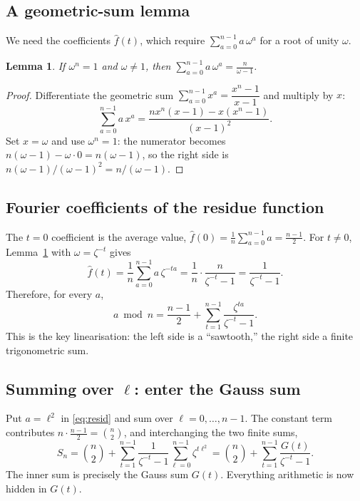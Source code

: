 \documentclass[11pt]{article}
\newtheorem{lemma}{Lemma}
\begin{document}
\subsection{A geometric-sum lemma}
We need the coefficients $\hat f(t)$, which require $\sum_{a=0}^{n-1}a\,\omega^a$ for a root of unity $\omega$.

\begin{lemma}\label{lem:geo}
If $\omega^n=1$ and $\omega\ne1$, then $\displaystyle\sum_{a=0}^{n-1}a\,\omega^{a}=\frac{n}{\omega-1}$.
\end{lemma}

\begin{proof}
Differentiate the geometric sum $\sum_{a=0}^{n-1}x^a=\dfrac{x^n-1}{x-1}$ and multiply by $x$:
\[
\sum_{a=0}^{n-1}a\,x^{a}=\frac{n x^{n}(x-1)-x(x^{n}-1)}{(x-1)^2}.
\]
Set $x=\omega$ and use $\omega^n=1$: the numerator becomes $n(\omega-1)-\omega\cdot0=n(\omega-1)$, so the right
side is $n(\omega-1)/(\omega-1)^2=n/(\omega-1)$.
\end{proof}

\subsection{Fourier coefficients of the residue function}
The $t=0$ coefficient is the average value, $\hat f(0)=\frac1n\sum_{a=0}^{n-1}a=\frac{n-1}{2}$. For $t\ne0$,
Lemma~\ref{lem:geo} with $\omega=\zeta^{-t}$ gives
\[
\hat f(t)=\frac1n\sum_{a=0}^{n-1}a\,\zeta^{-ta}=\frac1n\cdot\frac{n}{\zeta^{-t}-1}=\frac{1}{\zeta^{-t}-1}.
\]
Therefore, for every $a$,
\begin{equation}\label{eq:resid}
a\bmod n=\frac{n-1}{2}+\sum_{t=1}^{n-1}\frac{\zeta^{ta}}{\zeta^{-t}-1}.
\end{equation}
This is the key linearisation: the left side is a ``sawtooth,'' the right side a finite trigonometric sum.

\subsection{Summing over $\ell$: enter the Gauss sum}
Put $a=\ell^2$ in \eqref{eq:resid} and sum over $\ell=0,\dots,n-1$. The constant term contributes
$n\cdot\frac{n-1}2=\binom n2$, and interchanging the two finite sums,
\begin{equation}\label{eq:S-gauss}
S_n=\binom n2+\sum_{t=1}^{n-1}\frac{1}{\zeta^{-t}-1}\sum_{\ell=0}^{n-1}\zeta^{t\ell^2}
=\binom n2+\sum_{t=1}^{n-1}\frac{G(t)}{\zeta^{-t}-1}.
\end{equation}
The inner sum is precisely the Gauss sum $G(t)$. Everything arithmetic is now hidden in $G(t)$.
\end{document}
